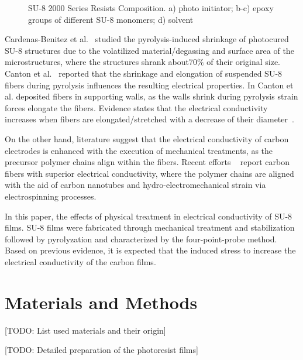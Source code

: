 \documentclass[3p,,preprint,12pt]{elsarticle}
\makeatletter
\def\fixFloatSize#1{}%
\makeatother
\begin{document}
\bgroup
\fixFloatSize{images/c87f718a-dcb5-4fbe-957b-20a0d5843959-usu8composition.png}
\begin{figure}[!htbp]
\centering \makeatletter{}
\makeatother 
\caption{{SU-8 2000 Series Resists Composition. a) photo initiator; b-c) epoxy groups of different SU-8 monomers; d) solvent}}
\label{f-d9067a619988}
\end{figure}
\egroup
Cardenas-Benitez et al.\unskip~\cite{708527:16798894} studied the pyrolysis-induced shrinkage of photocured SU-8 structures due to the volatilized material/degassing and surface area of the microstructures, where the structures shrank about$70\% $ of their original size. Canton et al.\unskip~\cite{708527:16798990} reported that the shrinkage and elongation of suspended SU-8 fibers during pyrolysis influences the resulting electrical properties. In Canton et al. deposited fibers in supporting walls, as the walls shrink during pyrolysis strain forces elongate the fibers. Evidence states that the electrical conductivity increases when fibers are elongated/stretched with a decrease of their diameter\unskip~\cite{708527:16798990}. 

On the other hand, literature suggest that the electrical conductivity of carbon electrodes is enhanced with the execution of mechanical treatments, as the precursor polymer chains align within the fibers. Recent efforts \unskip~\cite{708527:16799034,708527:16799035} report carbon fibers with superior electrical conductivity, where the polymer chains are aligned with the aid of carbon nanotubes and hydro-electromechanical strain via electrospinning processes.

In this paper, the effects of physical treatment in electrical conductivity of SU-8 films. SU-8 films were fabricated through mechanical treatment and stabilization followed by pyrolyzation and characterized by the four-point-probe method. Based on previous evidence, it is expected that the induced stress to increase the electrical conductivity of the carbon films.
    
\section{Materials and Methods}
[TODO: List used materials and their origin]

[TODO: Detailed preparation of the photoresist films]
\end{document}
